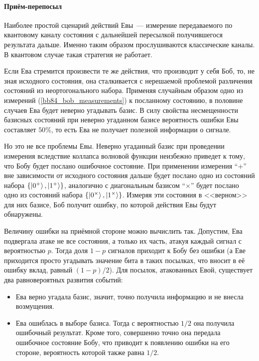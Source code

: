 \paragraph{Приём-перепосыл}
Наиболее простой сценарий действий Евы~--- измерение передаваемого по квантовому каналу состояния с дальнейшей пересылкой получившегося результата дальше. Именно таким образом прослушиваются классические каналы. В квантовом случае такая стратегия не работает.

Если Ева стремится произвести те же действия, что производит у себя Боб, то, не зная исходного состояния, она сталкивается с нерешаемой проблемой различения состояний из неортогонального набора. 
Применяя случайным образом одно из измерений (\ref{bb84_bob_measurements})
к посланному состоянию, в половине случаев Ева будет неверно угадывать базис. В силу свойства несмещенности базисных состояний при неверно угаданном базисе вероятность ошибки Евы составляет $50\%$, то есть Ева не получает полезной информации о сигнале.

Но это не все проблемы Евы. Неверно угаданный базис при проведении измерения вследствие коллапса волновой функции неизбежно приведет к тому, что Бобу будет послано ошибочное состояние. При применении измерения ``$+$'' вне зависимости от исходного состояния дальше будет послано одно из состояний набора $\{\left| 0^+ \right\rangle, \left| 1^+ \right\rangle\}$, аналогично с диагональным базисом ``$\times$'' будет послано одно из состояний набора $\{\left| 0^\times \right\rangle, \left| 1^\times \right\rangle\}$. Измеряя эти состояния в <<верном>> для них базисе, Боб получит ошибку, по которой действия Евы будут обнаружены.

Величину ошибки на приёмной стороне можно вычислить так. Допустим, Ева подвергала атаке не все состояния, а только их часть, атакуя каждый сигнал с вероятностью $p$. Тогда доля $1-p$ сигналов приходит к Бобу без ошибки (а Еве приходится просто угадывать значение бита в таких посылках, что вносит в её ошибку вклад, равный $(1-p)/2$). 
Для посылок, атакованных Евой, существует два равновероятных развития событий:
\begin{itemize}
  \item Ева верно угадала базис, значит, точно получила информацию и не внесла возмущения.
  \item Ева ошиблась в выборе базиса. Тогда с вероятностью $1/2$ она получила ошибочный результат. Кроме того, совершенно точно она передала ошибочное состояние Бобу, что приводит к появлению ошибки на его стороне, вероятность которой также равна $1/2$. 
\end{itemize}

